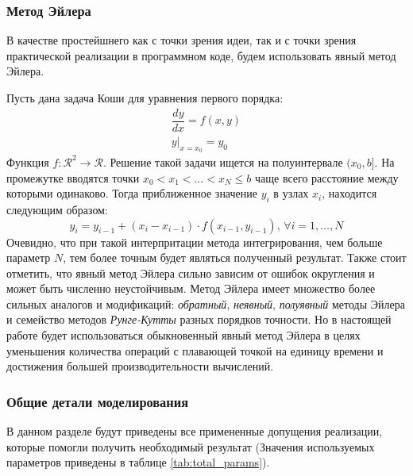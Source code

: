 \begin{centering}
    \subsubsection{Метод Эйлера}
\end{centering}
В качестве простейшнего как с точки зрения идеи, так и с точки зрения практической реализации в программном коде, будем использовать явный метод Эйлера.

Пусть дана задача Коши для уравнения первого порядка:
\begin{equation}
    \begin{gathered}
        \dfrac{dy}{dx} = f(x, y)\\
        y|_{x=x_0}=y_0
    \end{gathered}
\end{equation}
Функция $f:\mathcal{R}^2 \to \mathcal{R}$. Решение такой задачи ищется на полуинтервале $(x_0, b]$. На промежутке вводятся точки $x_0 < x_1 < \dots < x_N \leq b$ чаще всего расстояние между которыми одинаково. Тогда приближенное значение $y_i$ в узлах $x_i$, находится следующим образом:
\begin{equation}
    y_i = y_{i - 1} + (x_i - x_{i - 1}) \cdot f(x_{i - 1}, y_{i - 1}),\,\forall i = 1,\dots,N
\end{equation}
Очевидно, что при такой интерпритации метода интегрирования, чем больше параметр $N$, тем более точным будет являться полученный результат. Также стоит отметить, что явный метод Эйлера сильно зависим от ошибок округления и может быть численно неустойчивым.
Метод Эйлера имеет множество более сильных аналогов и модификаций: {\it обратный}, {\it неявный}, {\it полуявный} методы Эйлера и семейство методов {\it Рунге-Кутты} разных порядков точности. Но в настоящей работе будет использоваться обыкновенный явный метод Эйлера в целях уменьшения количества операций с плавающей точкой на единицу времени и достижения большей производительности вычислений.

\begin{centering}
    \subsubsection{Общие детали моделирования}
\end{centering}

В данном разделе будут приведены все примененные допущения реализации, которые помогли получить необходимый результат (Значения используемых параметров приведены в таблице \ref{tab:total_params}). 

